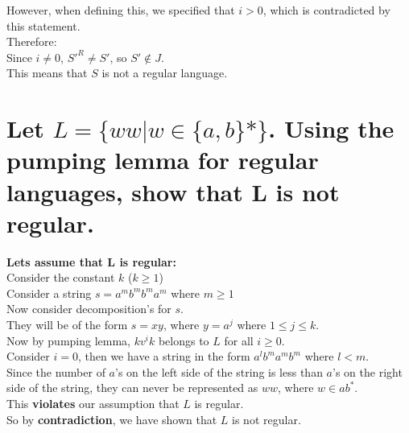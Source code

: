 \documentclass{article}
\begin{document}
However, when defining this, we specified that $i > 0$, which is contradicted by this statement. \\
Therefore: \\
Since $i \not = 0$, $S'^R \not = S'$, so $S' \not \in J$. \\
This means that $S$ is not a regular language.


\section{Let $L = \{ww | w \in \{a,b\}* \}$. Using the pumping lemma for regular languages, show that L is not regular.}

\textbf{Lets assume that L is regular: }
\\
Consider the constant $k$ ($k \ge 1$)
\\
Consider a string $s = a^mb^mb^ma^m$ where $m \ge 1$
\\
Now consider decomposition's for $s$.
\\
They will be of the form $s=xy$, where $y=a^j$ where $1 \le j \le k$.
\\
Now by pumping lemma, $k v^i k$ belongs to $L$ for all $i \ge 0$.
\\
Consider $i=0$, then we have a string in the form $a^l b^m a^m b^m$ where $l < m$.
\\
Since the number of $a$'s on the left side of the string is less than $a$'s on the right side of the string, they can never be represented as $ww$, where $w \in ab^*$.
\\
This \textbf{violates} our assumption that $L$ is regular.
\\
So by \textbf{contradiction}, we have shown that $L$ is not regular.
\end{document}
